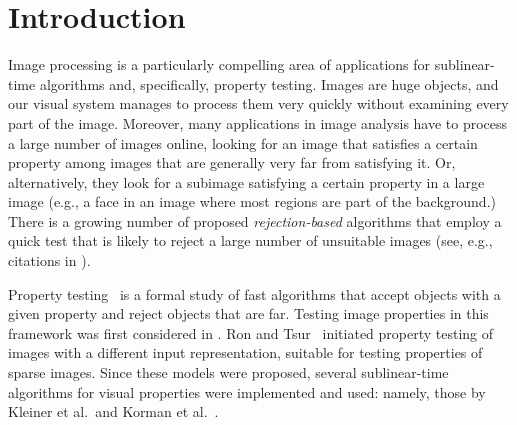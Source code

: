 \documentclass[11pt,english]{article}
\numberwithin{figure}{section}
\begin{document}
\section{Introduction}\label{sec:intro}
Image processing is a particularly compelling area of applications for sublinear-time algorithms and, specifically, property testing. Images are huge objects, and our visual system manages to process them very quickly without examining every part of the image. Moreover, many applications in image analysis have to process a large number of images online, looking for an image that satisfies a certain property among images that are generally very far from satisfying it. Or, alternatively, they look for a subimage satisfying a certain property in a large image (e.g., a face in an image where most regions are part of the background.) There is a growing number of proposed {\em rejection-based} algorithms that employ a quick test that is likely to reject a large number of unsuitable images (see, e.g., citations in \cite{KleinerKNB11}).

Property testing~\cite{RS96,GGR98} is a formal study of fast algorithms that accept objects with a given property and reject objects that are far. Testing image properties in this framework was first considered in \cite{Ras03}. Ron and Tsur~\cite{TsurR10} initiated property testing of images with a different input representation, suitable for testing properties of sparse images. Since these models were proposed, several sublinear-time algorithms for visual properties were implemented and used: namely, those by Kleiner et al.\ and Korman et al.\ \cite{KleinerKNB11,KormanRT,KormanRTA13}.
\end{document}
